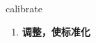 
\begin{frame}
{\huge calibrate}
\begin{center}
\begin{enumerate}\Large
  \item \textbf{调整，使标准化}
\end{enumerate}
\end{center}
\end{frame}
